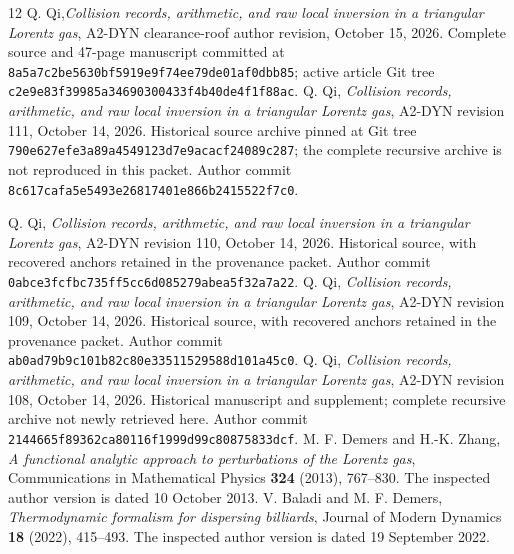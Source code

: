\documentclass[11pt,reqno]{amsart}
\numberwithin{equation}{section}
\theoremstyle{definition}\newtheorem{definition}[theorem]{Definition}
\theoremstyle{remark}\newtheorem{remark}[theorem]{Remark}
\begin{document}
\begin{thebibliography}{12}
 Q. Qi,\emph{Collision records, arithmetic, and raw local inversion in a
triangular Lorentz gas}, A2-DYN clearance-roof author revision,
October 15, 2026. Complete source and 47-page manuscript
committed at \texttt{8a5a7c2be5630bf5919e9f74ee79de01af0dbb85};
active article Git tree \texttt{c2e9e83f39985a34690300433f4b40de4f1f88ac}.
 Q. Qi,
\emph{Collision records, arithmetic, and raw local inversion in a
triangular Lorentz gas}, A2-DYN revision 111, October 14, 2026.
Historical source archive pinned at Git tree \texttt{790e627efe3a89a4549123d7e9acacf24089c287}; the complete recursive archive is not reproduced in this packet.
Author commit \texttt{8c617cafa5e5493e26817401e866b2415522f7c0}.

 Q. Qi,
\emph{Collision records, arithmetic, and raw local inversion in a
triangular Lorentz gas}, A2-DYN revision 110, October 14, 2026.
Historical source, with recovered anchors retained in the provenance packet.
Author commit \texttt{0abce3fcfbc735ff5cc6d085279abea5f32a7a22}.
 Q. Qi,
\emph{Collision records, arithmetic, and raw local inversion in a
triangular Lorentz gas}, A2-DYN revision 109, October 14, 2026.
Historical source, with recovered anchors retained in the provenance packet.
Author commit \texttt{ab0ad79b9c101b82c80e33511529588d101a45c0}.
 Q. Qi,
\emph{Collision records, arithmetic, and raw local inversion in a
triangular Lorentz gas}, A2-DYN revision 108, October 14, 2026.
Historical manuscript and supplement; complete recursive archive not newly retrieved here. Author commit
\texttt{2144665f89362ca80116f1999d99c80875833dcf}.
 M. F. Demers and H.-K. Zhang,
\emph{A functional analytic approach to perturbations of the Lorentz gas},
Communications in Mathematical Physics \textbf{324} (2013), 767--830.
The inspected author version is dated 10 October 2013.
 V. Baladi and M. F. Demers,
\emph{Thermodynamic formalism for dispersing billiards},
Journal of Modern Dynamics \textbf{18} (2022), 415--493.
The inspected author version is dated 19 September 2022.
\end{thebibliography}
\end{document}
